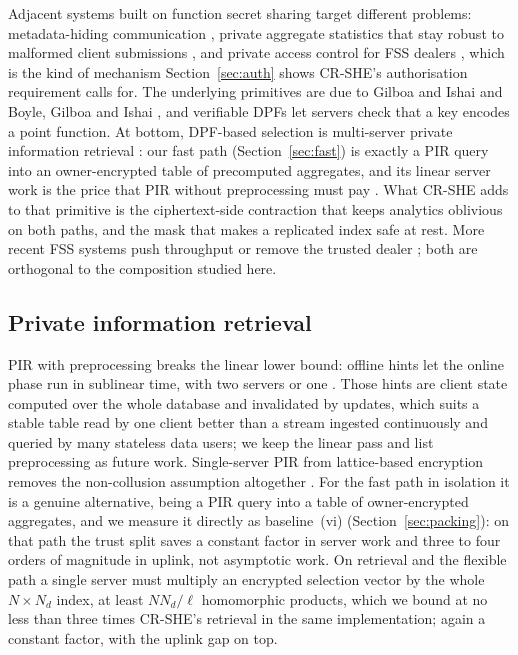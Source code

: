 \documentclass[a4paper,fleqn]{cas-dc}
\begin{document}
Adjacent systems built on function secret sharing target different problems:
metadata-hiding communication \citep{express}, private aggregate statistics
that stay robust to malformed client submissions
\citep{corrigan2017prio,boneh2021lightweight}, and private access control for
FSS dealers \citep{pacl}, which is the kind of mechanism
Section~\ref{sec:auth} shows CR-SHE's authorisation requirement calls for. The
underlying primitives are due to Gilboa and Ishai
\citep{gilboa2014distributed} and Boyle, Gilboa and Ishai
\citep{boyle2015function,boyle2016function}, and verifiable DPFs
\citep{decastro2022lightweight} let servers check that a key encodes a point
function. At bottom, DPF-based selection is multi-server private information
retrieval \citep{chor1998private}: our fast path (Section~\ref{sec:fast}) is
exactly a PIR query into an owner-encrypted table of precomputed aggregates,
and its linear server work is the price that PIR without preprocessing must
pay \citep{beimel2000reducing}. What CR-SHE adds to that primitive is the
ciphertext-side contraction that keeps analytics oblivious on both paths,
and the mask that makes a replicated index safe at rest. More recent FSS
systems push throughput \citep{storrier2023grotto} or remove the trusted
dealer \citep{doerner2017scaling}; both are orthogonal to the composition
studied here.

\subsection{Private information retrieval}
PIR with preprocessing breaks the linear lower bound: offline hints let the
online phase run in sublinear time, with two servers
\citep{corrigan2020private} or one \citep{corrigan2022single,zhou2024piano}.
Those hints are client state computed over the whole database and invalidated
by updates, which suits a stable table read by one client better than a stream
ingested continuously and queried by many stateless data users; we keep the
linear pass and list preprocessing as future work. Single-server PIR from
lattice-based encryption
\citep{angel2018pir,mughees2021onionpir,menon2022spiral,davidson2023frodopir}
removes the non-collusion assumption altogether
\citep{kushilevitz1997replication}. For the fast path in isolation it is a
genuine alternative, being a PIR query into a table of owner-encrypted
aggregates, and we measure it directly as baseline~(vi)
(Section~\ref{sec:packing}): on that path the trust split saves a constant
factor in server work and three to four orders of magnitude in uplink, not
asymptotic work. On retrieval and the flexible path a single server must
multiply an encrypted selection vector by the whole $N\times N_d$ index, at
least $NN_d/\ell$ homomorphic products, which we bound at no less than three
times CR-SHE's retrieval in the same implementation; again a constant factor,
with the uplink gap on top.
\end{document}
